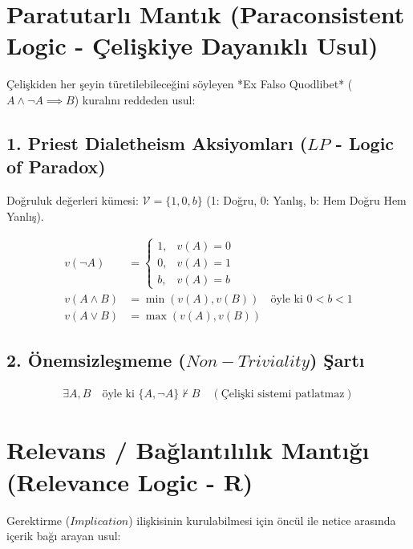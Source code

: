 \documentclass[11pt, a4paper]{article}
\begin{document}
\section{Paratutarlı Mantık (Paraconsistent Logic - Çelişkiye Dayanıklı Usul)}

Çelişkiden her şeyin türetilebileceğini söyleyen *Ex Falso Quodlibet* ($A \land \neg A \implies B$) kuralını reddeden usul:

\subsection{1. Priest Dialetheism Aksiyomları ($LP$ - Logic of Paradox)}
Doğruluk değerleri kümesi: $\mathcal{V} = \{1, 0, b\}$ (1: Doğru, 0: Yanlış, b: Hem Doğru Hem Yanlış).

\begin{align}
v(\neg A) &= 
\begin{cases}
1, & v(A) = 0 \\
0, & v(A) = 1 \\
b, & v(A) = b
\end{cases} \\
v(A \land B) &= \min(v(A), v(B)) \quad \text{öyle ki } 0 < b < 1 \\
v(A \lor B) &= \max(v(A), v(B))
\end{align}

\subsection{2. Önemsizleşmeme ($Non-Triviality$) Şartı}
\begin{align}
\exists A, B \quad \text{öyle ki } \{A, \neg A\} \nvdash B \quad (\text{Çelişki sistemi patlatmaz})
\end{align}

\section{Relevans / Bağlantılılık Mantığı (Relevance Logic - $\mathbf{R}$)}

Gerektirme ($Implication$) ilişkisinin kurulabilmesi için öncül ile netice arasında içerik bağı arayan usul:
\end{document}
